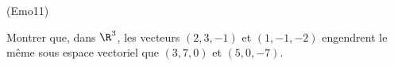 \begin{tiny}(Emo11)\end{tiny} 
Montrer que, dans $\R^{3}$, les vecteurs $(2,3,-1)$ et $(1,-1,-2)$ engendrent le m{\^e}me sous espace vectoriel que $(3,7,0)$ et $(5,0,-7)$.
